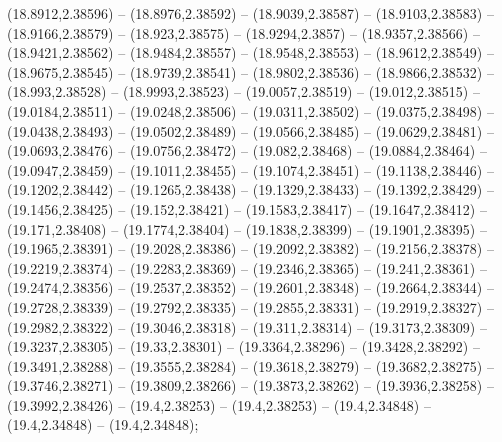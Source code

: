 {(18.8912,2.38596) -- (18.8976,2.38592) -- (18.9039,2.38587) -- (18.9103,2.38583) -- (18.9166,2.38579) -- (18.923,2.38575) -- (18.9294,2.3857) -- (18.9357,2.38566) -- (18.9421,2.38562) -- (18.9484,2.38557) -- (18.9548,2.38553) -- (18.9612,2.38549) --
(18.9675,2.38545) -- (18.9739,2.38541) -- (18.9802,2.38536) -- (18.9866,2.38532) -- (18.993,2.38528) -- (18.9993,2.38523) -- (19.0057,2.38519) -- (19.012,2.38515) -- (19.0184,2.38511) -- (19.0248,2.38506) -- (19.0311,2.38502) -- (19.0375,2.38498) --
(19.0438,2.38493) -- (19.0502,2.38489) -- (19.0566,2.38485) -- (19.0629,2.38481) -- (19.0693,2.38476) -- (19.0756,2.38472) -- (19.082,2.38468) -- (19.0884,2.38464) -- (19.0947,2.38459) -- (19.1011,2.38455) -- (19.1074,2.38451) -- (19.1138,2.38446)
-- (19.1202,2.38442) -- (19.1265,2.38438) -- (19.1329,2.38433) -- (19.1392,2.38429) -- (19.1456,2.38425) -- (19.152,2.38421) -- (19.1583,2.38417) -- (19.1647,2.38412) -- (19.171,2.38408) -- (19.1774,2.38404) -- (19.1838,2.38399) -- (19.1901,2.38395)
-- (19.1965,2.38391) -- (19.2028,2.38386) -- (19.2092,2.38382) -- (19.2156,2.38378) -- (19.2219,2.38374) -- (19.2283,2.38369) -- (19.2346,2.38365) -- (19.241,2.38361) -- (19.2474,2.38356) -- (19.2537,2.38352) -- (19.2601,2.38348) --
(19.2664,2.38344) -- (19.2728,2.38339) -- (19.2792,2.38335) -- (19.2855,2.38331) -- (19.2919,2.38327) -- (19.2982,2.38322) -- (19.3046,2.38318) -- (19.311,2.38314) -- (19.3173,2.38309) -- (19.3237,2.38305) -- (19.33,2.38301) -- (19.3364,2.38296) --
(19.3428,2.38292) -- (19.3491,2.38288) -- (19.3555,2.38284) -- (19.3618,2.38279) -- (19.3682,2.38275) -- (19.3746,2.38271) -- (19.3809,2.38266) -- (19.3873,2.38262) -- (19.3936,2.38258) -- (19.3992,2.38426) -- (19.4,2.38253) -- (19.4,2.38253) --
(19.4,2.34848) -- (19.4,2.34848) -- (19.4,2.34848);

}
